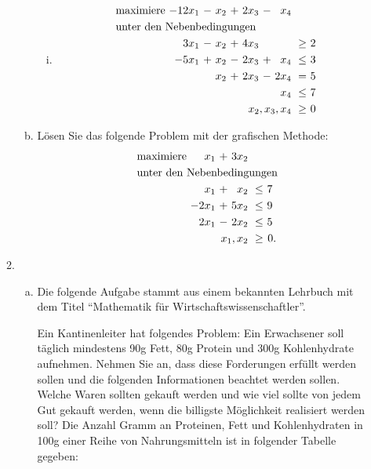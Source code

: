 \documentclass[10pt, a4paper]{article}
\begin{document}
\begin{enumerate}[\bfseries A:]
\begin{enumerate}[\bfseries 1.]
\begin{enumerate}[a)]
\begin{enumerate}[(i)]
\item \begin{align*}
\begin{alignedat}{6}
& \text{maximiere } & -12x_1 &\ - &\ x_2 &\ + &\ 2x_3 &\ - &\ x_4 & & \\
& \rlap{unter den Nebenbedingungen} & & & & & & & & & \\
&&  3x_1 &\ - &\ x_2 &\ + &\ 4x_3 &    &       &\ \geq &\  2 \\
&& -5x_1 &\ + &\ x_2 &\ - &\ 2x_3 &\ + &\  x_4 &\ \leq &\  3 \\
&&       &    &\ x_2 &\ + &\ 2x_3 &\ - &\ 2x_4 &\ =    &\  5 \\
&& 	     &    &      &    &       &    &\  x_4 &\ \leq &\  7 \\
&& & & & & & & \llap{$x_2,x_3,x_4$} &\ \geq &\ 0
\end{alignedat}
\end{align*}
\end{enumerate}

\item Lösen Sie das folgende Problem mit der grafischen Methode:
\begin{align*}
\begin{alignedat}{4}
& \text{maximiere } & x_1 &\ + &\ 3x_2 & & \\
& \rlap{unter den Nebenbedingungen} & & & & & \\
&&   x_1 &\ + &\  x_2 &\ \leq &\  7\ \\
&& -2x_1 &\ + &\ 5x_2 &\ \leq &\  9\ \\
&&  2x_1 &\ - &\ 2x_2 &\ \leq &\  5\ \\
&& & & \llap{$x_1,x_2$} &\ \geq &\ 0.
\end{alignedat}
\end{align*}
\end{enumerate}

\item \begin{enumerate}[a)]

\item Die folgende Aufgabe stammt aus einem bekannten Lehrbuch mit dem Titel \enquote{Mathematik für Wirtschaftswissenschaftler}.

\medskip

Ein Kantinenleiter hat folgendes Problem: Ein Erwachsener soll täglich mindestens 90g Fett, 80g Protein und 300g Kohlenhydrate aufnehmen. Nehmen Sie an, dass diese Forderungen erfüllt werden sollen und die folgenden Informationen beachtet werden sollen. Welche Waren sollten gekauft werden und wie viel sollte von jedem Gut gekauft werden, wenn die billigste Möglichkeit realisiert werden soll? Die Anzahl Gramm an Proteinen, Fett und Kohlenhydraten in 100g einer Reihe von Nahrungsmitteln ist in folgender Tabelle gegeben:


\end{enumerate}
\end{enumerate}
\end{enumerate}
\end{document}
